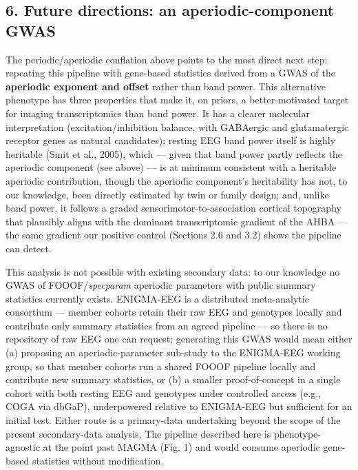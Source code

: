 \documentclass[
  11pt,
  letterpaper,
]{article}
\begin{document}
\subsection{6. Future directions: an aperiodic-component
GWAS}\label{future-directions-an-aperiodic-component-gwas}

The periodic/aperiodic conflation above points to the most direct next
step: repeating this pipeline with gene-based statistics derived from a
GWAS of the \textbf{aperiodic exponent and offset} rather than band
power. This alternative phenotype has three properties that make it, on
priors, a better-motivated target for imaging transcriptomics than band
power. It has a clearer molecular interpretation (excitation/inhibition
balance, with GABAergic and glutamatergic receptor genes as natural
candidates); resting EEG band power itself is highly heritable (Smit et
al., 2005), which --- given that band power partly reflects the
aperiodic component (see above) --- is at minimum consistent with a
heritable aperiodic contribution, though the aperiodic component's
heritability has not, to our knowledge, been directly estimated by twin
or family design; and, unlike band power, it follows a graded
sensorimotor-to-association cortical topography that plausibly aligns
with the dominant transcriptomic gradient of the AHBA --- the same
gradient our positive control (Sections 2.6 and 3.2) shows the pipeline
can detect.

This analysis is not possible with existing secondary data: to our
knowledge no GWAS of FOOOF/\emph{specparam} aperiodic parameters with
public summary statistics currently exists. ENIGMA-EEG is a distributed
meta-analytic consortium --- member cohorts retain their raw EEG and
genotypes locally and contribute only summary statistics from an agreed
pipeline --- so there is no repository of raw EEG one can request;
generating this GWAS would mean either (a) proposing an
aperiodic-parameter sub-study to the ENIGMA-EEG working group, so that
member cohorts run a shared FOOOF pipeline locally and contribute new
summary statistics, or (b) a smaller proof-of-concept in a single cohort
with both resting EEG and genotypes under controlled access (e.g., COGA
via dbGaP), underpowered relative to ENIGMA-EEG but sufficient for an
initial test. Either route is a primary-data undertaking beyond the
scope of the present secondary-data analysis. The pipeline described
here is phenotype-agnostic at the point past MAGMA (Fig. 1) and would
consume aperiodic gene-based statistics without modification.
\end{document}
